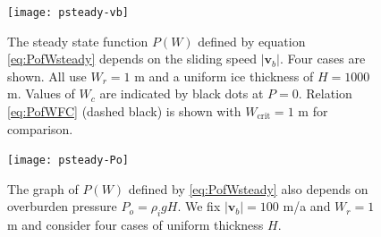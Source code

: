 \documentclass[gmd]{copernicus}   %
\newcommand{\text}{\textrm}
\newcommand\bv{\mathbf{v}}
\begin{document}
\begin{figure}[ht]
\texttt{[image: psteady-vb]}
\caption{The steady state function $P(W)$ defined by equation \eqref{eq:PofWsteady} depends on the sliding speed $|\bv_b|$.  Four cases are shown.  All use $W_r=1$ m and a uniform ice thickness of $H=1000$ m.  Values of $W_c$ are indicated by black dots at $P=0$.  Relation \eqref{eq:PofWFC} (dashed black) is shown with $W_{\text{crit}}=1$ m for comparison.}
\label{fig:psteady-vb}
\end{figure}

\begin{figure}[ht]
\texttt{[image: psteady-Po]}
\caption{The graph of $P(W)$ defined by \eqref{eq:PofWsteady} also depends on overburden pressure $P_o=\rho_i g H$.  We fix $|\bv_b|=100$ m/a and $W_r=1$ m and consider four cases of uniform thickness $H$.}
\label{fig:psteady-Po}
\end{figure}
\end{document}

